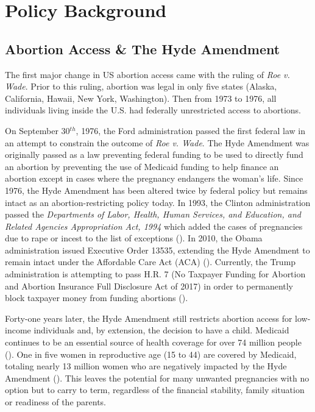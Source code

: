 \section{Policy Background}
    \subsection{Abortion Access \& The Hyde Amendment}
        The first major change in US abortion access came with the ruling of \textit{Roe v. Wade}. Prior to this ruling, abortion was legal in only five states (Alaska, California, Hawaii, New York, Washington). Then from 1973 to 1976, all individuals living inside the U.S. had federally unrestricted access to abortions.

        On September 30$^{th}$, 1976, the Ford administration passed the first federal law in an attempt to constrain the outcome of \textit{Roe v. Wade}. The Hyde Amendment was originally passed as a law preventing federal funding to be used to directly fund an abortion by preventing the use of Medicaid funding to help finance an abortion except in cases where the pregnancy endangers the woman's life.
        Since 1976, the Hyde Amendment has been altered twice by federal policy but remains intact as an abortion-restricting policy today. In 1993, the Clinton administration passed the \textit{Departments of Labor, Health, Human Services, and Education, and Related Agencies Appropriation Act, 1994} which added the cases of pregnancies due to rape or incest to the list of exceptions (\cite{clinton}). In 2010, the Obama administration issued Executive Order 13535, extending the Hyde Amendment to remain intact under the Affordable Care Act (ACA) (\cite{obama}). Currently, the Trump administration is attempting to pass H.R. 7 (No Taxpayer Funding for Abortion and Abortion Insurance Full Disclosure Act of 2017) in order to permanently block taxpayer money from funding abortions (\cite{trump}).

        Forty-one years later, the Hyde Amendment still restricts abortion access for low-income individuals and, by extension, the decision to have a child. Medicaid continues to be an essential source of health coverage for over 74 million people (\cite{1_in_5}). One in five women in reproductive age (15 to 44) are covered by Medicaid, totaling nearly 13 million women who are negatively impacted by the Hyde Amendment (\cite{1_in_5}). This leaves the potential for many unwanted pregnancies with no option but to carry to term, regardless of the financial stability, family situation or readiness of the parents.
